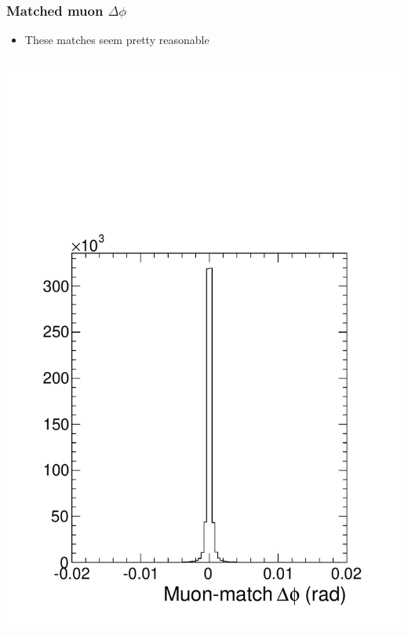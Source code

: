 \documentclass[compress]{beamer}
\begin{document}
\begin{frame}
\frametitle{Matched muon $\Delta \phi$}

\begin{itemize}
\item These matches seem pretty reasonable
\end{itemize}

\begin{columns}
\includegraphics[width=\linewidth]{match_dphi.pdf}

\end{columns}
\end{frame}
\end{document}
